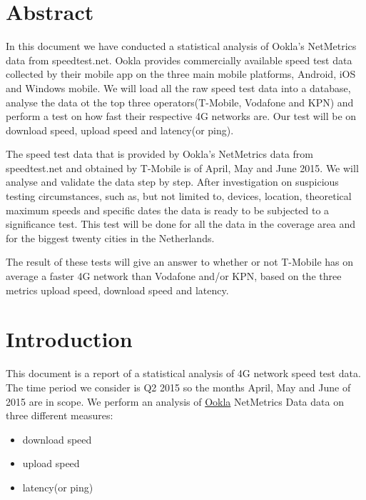 \documentclass[]{article}
\begin{document}
\newpage

\section{Abstract}\label{abstract}

In this document we have conducted a statistical analysis of Ookla's
NetMetrics data from speedtest.net. Ookla provides commercially
available speed test data collected by their mobile app on the three
main mobile platforms, Android, iOS and Windows mobile. We will load all
the raw speed test data into a database, analyse the data ot the top
three operators(T-Mobile, Vodafone and KPN) and perform a test on how
fast their respective 4G networks are. Our test will be on download
speed, upload speed and latency(or ping).

The speed test data that is provided by Ookla's NetMetrics data from
speedtest.net and obtained by T-Mobile is of April, May and June 2015.
We will analyse and validate the data step by step. After investigation
on suspicious testing circumstances, such as, but not limited to,
devices, location, theoretical maximum speeds and specific dates the
data is ready to be subjected to a significance test. This test will be
done for all the data in the coverage area and for the biggest twenty
cities in the Netherlands.

The result of these tests will give an answer to whether or not T-Mobile
has on average a faster 4G network than Vodafone and/or KPN, based on
the three metrics upload speed, download speed and latency.

\newpage

\section{Introduction}\label{introduction}

This document is a report of a statistical analysis of 4G network speed
test data. The time period we consider is Q2 2015 so the months April,
May and June of 2015 are in scope. We perform an analysis of
\href{http://www.ookla.com/}{Ookla} NetMetrics Data data on three
different measures:

\begin{itemize}
\itemsep1pt\parskip0pt
\item
  download speed
\item
  upload speed
\item
  latency(or ping)
\end{itemize}
\end{document}
